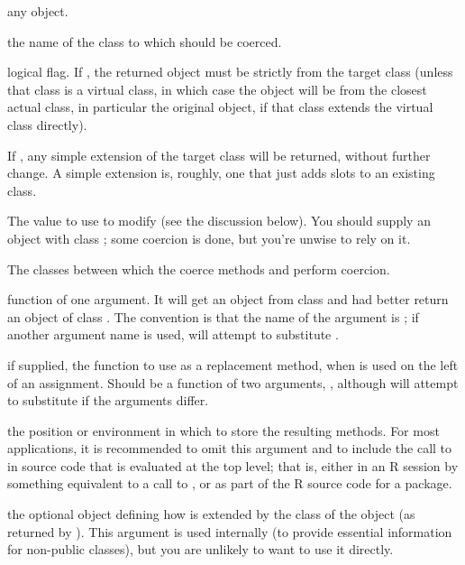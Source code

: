 \begin{Arguments}
\begin{ldescription}
\item[\code{object}] any \R{} object.
\item[\code{Class}] the name of the class to which  should be
coerced. 
\item[\code{strict}] logical flag.  If , the returned object
must be strictly from the target class (unless that class is a
virtual class, in which case the object will be from the closest
actual class, in particular the original object, if that class extends the
virtual class directly).

If , any simple extension of the target class
will be returned, without further change.  A simple extension is,
roughly, one that just adds slots to an existing class.
\item[\code{value}] The value to use to modify  (see the
discussion below).  You should supply an object with class
; some coercion is done, but you're unwise to rely on
it.

\item[\code{from, to}] The classes between which the coerce methods
 and  perform coercion.

\item[\code{def}] function of one argument.  It will get an object from
class  and had better return an object of class
. The convention is that
the name of the argument is ; if another argument name
is used,  will attempt to substitute . 
\item[\code{replace}] if supplied, the function to use as a replacement
method, when  is used on the left of an assignment.
Should be a function of two arguments, ,
although  will attempt to substitute if the arguments differ.
\item[\code{where}] the position or environment in which to store the
resulting methods. For most applications, it is recommended to
omit this argument and to include the call to  in source code that is evaluated at the top level; that is, either in an R session by something equivalent to a call to , or as part of the R source code for a package.
\item[\code{ext}] the optional object
defining how  is extended by the class of the
object (as returned by ).
This argument is used internally (to provide essential
information for non-public classes), but you are unlikely to want
to use it directly.

\end{ldescription}
\end{Arguments}
